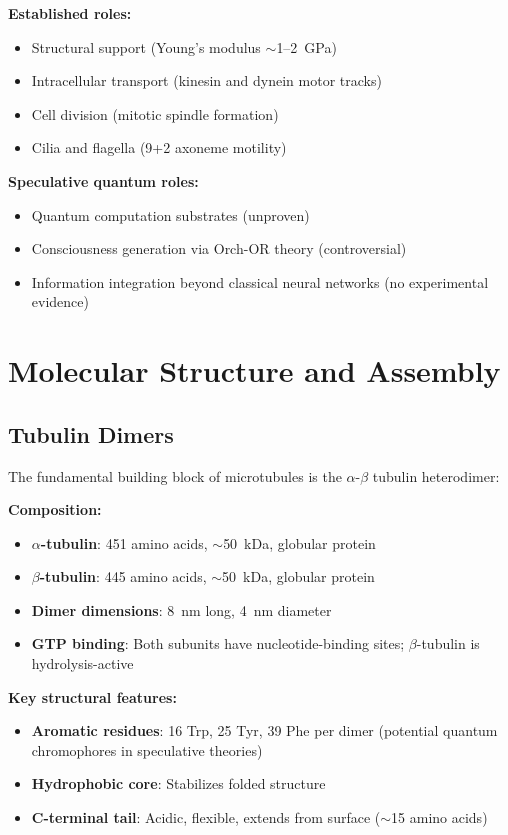 \textbf{Established roles:}
\begin{itemize}
\item Structural support (Young's modulus $\sim$1--2~GPa)
\item Intracellular transport (kinesin and dynein motor tracks)
\item Cell division (mitotic spindle formation)
\item Cilia and flagella (9+2 axoneme motility)
\end{itemize}

\textbf{Speculative quantum roles:}
\begin{itemize}
\item Quantum computation substrates (unproven)
\item Consciousness generation via Orch-OR theory (controversial)
\item Information integration beyond classical neural networks (no experimental evidence)
\end{itemize}

\section{Molecular Structure and Assembly}

\subsection{Tubulin Dimers}

The fundamental building block of microtubules is the $\alpha$-$\beta$ tubulin heterodimer:

\textbf{Composition:}
\begin{itemize}
\item \textbf{$\alpha$-tubulin}: 451 amino acids, $\sim$50~kDa, globular protein
\item \textbf{$\beta$-tubulin}: 445 amino acids, $\sim$50~kDa, globular protein
\item \textbf{Dimer dimensions}: 8~nm long, 4~nm diameter
\item \textbf{GTP binding}: Both subunits have nucleotide-binding sites; $\beta$-tubulin is hydrolysis-active
\end{itemize}

\textbf{Key structural features:}
\begin{itemize}
\item \textbf{Aromatic residues}: 16 Trp, 25 Tyr, 39 Phe per dimer (potential quantum chromophores in speculative theories)
\item \textbf{Hydrophobic core}: Stabilizes folded structure
\item \textbf{C-terminal tail}: Acidic, flexible, extends from surface ($\sim$15 amino acids)
\end{itemize}

